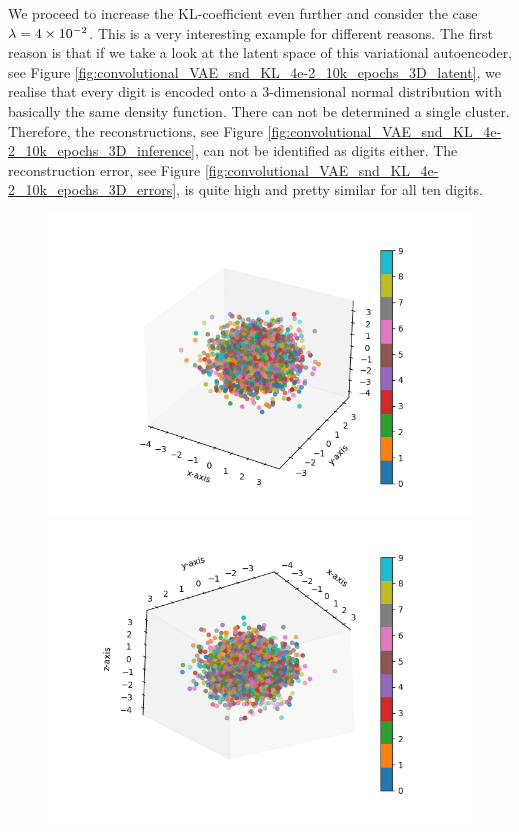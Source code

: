 We proceed to increase the KL-coefficient even further and consider the case $\lambda = \num{4e-2}$. This is a very interesting example for different reasons. The first reason is that if we take a look at the latent space of this variational autoencoder, see Figure \ref{fig:convolutional_VAE_snd_KL_4e-2_10k_epochs_3D_latent}, we realise that every digit is encoded onto a $3$-dimensional normal distribution with basically the same density function. There can not be determined a single cluster. Therefore, the reconstructions, see Figure \ref{fig:convolutional_VAE_snd_KL_4e-2_10k_epochs_3D_inference}, can not be identified as digits either. The reconstruction error, see Figure \ref{fig:convolutional_VAE_snd_KL_4e-2_10k_epochs_3D_errors}, is quite high and pretty similar for all ten digits.

\begin{figure}
\begin{center}
   \begin{minipage}[b]{0.49\linewidth}
      \includegraphics[trim = 20mm 10mm 20mm 10mm, clip, width=\linewidth]{convolutional_VAE_snd_KL_4e-2_10k_epochs_3D_latent_1}
	\end{minipage}
   \begin{minipage}[b]{0.49\linewidth}
      \includegraphics[trim = 20mm 10mm 20mm 10mm, clip, width=\linewidth]{convolutional_VAE_snd_KL_4e-2_10k_epochs_3D_latent_2}

\end{minipage}
\end{center}
\end{figure}
